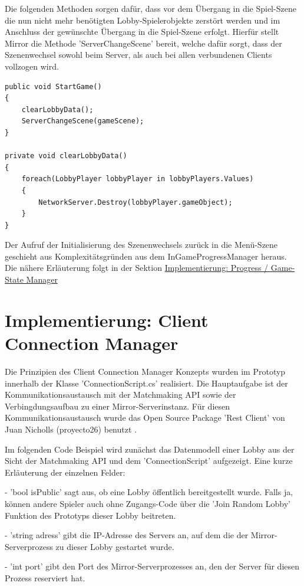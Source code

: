 Die folgenden Methoden sorgen dafür, dass vor dem Übergang in die Spiel-Szene die nun nicht mehr benötigten Lobby-Spielerobjekte zerstört werden und im Anschluss der gewünschte Übergang in die Spiel-Szene erfolgt. Hierfür stellt Mirror die Methode 'ServerChangeScene' bereit, welche dafür sorgt, dass der Szenenwechsel sowohl beim Server, als auch bei allen verbundenen Clients vollzogen wird.

\begin{lstlisting}[caption= GameNetworkManager.cs StartGame]
public void StartGame()
{
	clearLobbyData();
	ServerChangeScene(gameScene);
}

private void clearLobbyData()
{
	foreach(LobbyPlayer lobbyPlayer in lobbyPlayers.Values)
	{
		NetworkServer.Destroy(lobbyPlayer.gameObject);
	}
}
\end{lstlisting}

Der Aufruf der Initialisierung des Szenenwechsels zurück in die Menü-Szene geschieht aus Komplexitätsgründen aus dem InGameProgressManager heraus. Die nähere Erläuterung folgt in der Sektion \hyperref[Progress Manager]{Implementierung: Progress / Game-State Manager}

\section{Implementierung: Client Connection Manager}

Die Prinzipien des Client Connection Manager Konzepts wurden im Prototyp innerhalb der Klasse 'ConnectionScript.cs' realisiert. Die Hauptaufgabe ist der Kommunikationsaustausch mit der Matchmaking API sowie der Verbingdungsaufbau zu einer Mirror-Serverinstanz. Für diesen Kommunikationsaustausch wurde das Open Source Package 'Rest Client' von Juan Nicholls (proyecto26) benutzt \cite{GitHub.10.02.2022}.

Im folgenden Code Beispiel wird zunächst das Datenmodell einer Lobby aus der Sicht der Matchmaking API und dem 'ConnectionScript' aufgezeigt. Eine kurze Erläuterung der einzelnen Felder:

- 'bool isPublic' sagt aus, ob eine Lobby öffentlich bereitgestellt wurde. Falls ja, können andere Spieler auch ohne Zugangs-Code über die 'Join Random Lobby' Funktion des Prototyps dieser Lobby beitreten.

- 'string adress' gibt die IP-Adresse des Servers an, auf dem die der Mirror-Serverprozess zu dieser Lobby gestartet wurde.

- 'int port' gibt den Port des Mirror-Serverprozesses an, den der Server für diesen Prozess reserviert hat.

